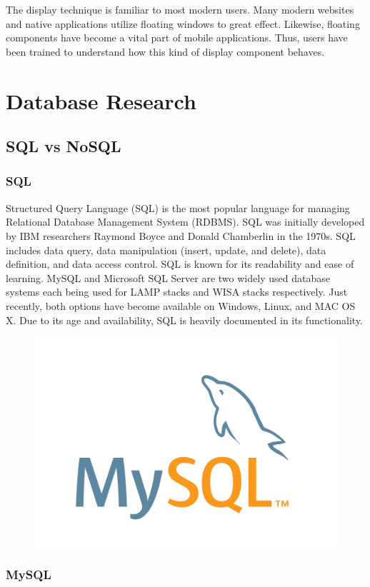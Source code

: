 \documentclass[12pt]{report}
\begin{document}
\begin{enumerate}
The display technique is familiar to most modern users. Many modern websites and native applications utilize floating windows to great effect. Likewise, floating components have become a vital part of mobile applications. Thus, users have been trained to understand how this kind of display component behaves.

\section*{Database Research}

\subsection*{SQL vs NoSQL}

\subsubsection*{SQL}

Structured Query Language (SQL) is the most popular language for managing Relational Database Management System (RDBMS).  SQL was initially developed by IBM researchers Raymond Boyce and Donald Chamberlin in the 1970s.  SQL includes data query, data manipulation (insert, update, and delete), data definition, and data access control.  SQL is known for its readability and ease of learning.  MySQL and Microsoft SQL Server are two widely used database systems each being used for LAMP stacks and WISA stacks respectively.  Just recently, both options have become available on Windows, Linux, and MAC OS X.  Due to its age and availability, SQL is heavily documented in its functionality.

\begin{figure}[h]
	\centering
	\includegraphics[width=0.251\linewidth]{mysql}
\end{figure}

\subsubsection*{MySQL}


\end{enumerate}
\end{document}
